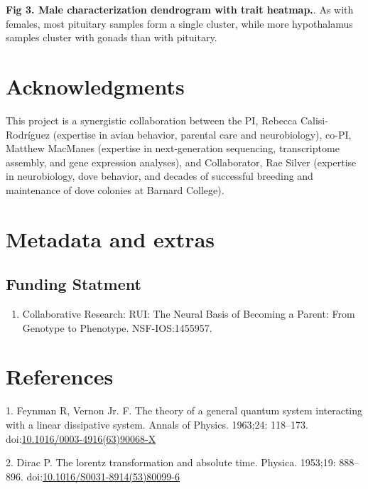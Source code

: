 \documentclass[10pt,letterpaper]{article}
\providecommand{\tightlist}{%
  \setlength{\itemsep}{0pt}\setlength{\parskip}{0pt}}
\begin{document}
\textbf{Fig 3. Male characterization dendrogram with trait heatmap.}. As
with females, most pituitary samples form a single cluster, while more
hypothalamus samples cluster with gonads than with pituitary.

\hypertarget{acknowledgments}{%
\section{Acknowledgments}\label{acknowledgments}}

This project is a synergistic collaboration between the PI, Rebecca
Calisi-Rodríguez (expertise in avian behavior, parental care and
neurobiology), co-PI, Matthew MacManes (expertise in next-generation
sequencing, transcriptome assembly, and gene expression analyses), and
Collaborator, Rae Silver (expertise in neurobiology, dove behavior, and
decades of successful breeding and maintenance of dove colonies at
Barnard College).

\hypertarget{metadata-and-extras}{%
\section{Metadata and extras}\label{metadata-and-extras}}

\hypertarget{funding-statment}{%
\subsection{Funding Statment}\label{funding-statment}}

\begin{enumerate}
\def\labelenumi{\arabic{enumi}.}
\tightlist
\item
  Collaborative Research: RUI: The Neural Basis of Becoming a Parent:
  From Genotype to Phenotype. NSF-IOS:1455957.
\end{enumerate}

\hypertarget{references}{%
\section*{References}\label{references}}

\hypertarget{refs}{}
\leavevmode\hypertarget{ref-Feynman1963118}{}%
1. Feynman R, Vernon Jr. F. The theory of a general quantum system
interacting with a linear dissipative system. Annals of Physics.
1963;24: 118--173.
doi:\href{https://doi.org/10.1016/0003-4916(63)90068-X}{10.1016/0003-4916(63)90068-X}

\leavevmode\hypertarget{ref-Dirac1953888}{}%
2. Dirac P. The lorentz transformation and absolute time. Physica.
1953;19: 888--896.
doi:\href{https://doi.org/10.1016/S0031-8914(53)80099-6}{10.1016/S0031-8914(53)80099-6}

\nolinenumbers
\end{document}
